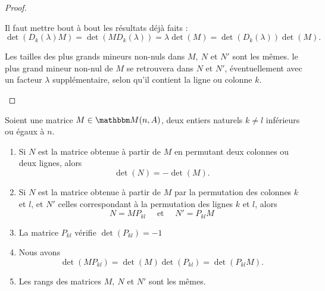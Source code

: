 \begin{proof}
\begin{subproof}
          \item[\ref{ITEMooIFRVooWQYgkK}]
            Il faut mettre bout à bout les résultats déjà faits :
            \begin{equation}
                \det(D_k(\lambda)M)=\det(MD_k(\lambda))=\lambda\det(M)=\det(D_k(\lambda))\det(M).
            \end{equation}
         \item[\ref{ITEMooRangsDilatations}]
            Les tailles des plus grands mineurs non-nuls dans \(M,\ N \) et \( N' \) sont les mêmes. le plus grand mineur non-nul de \( M \) se retrouvera dans \( N \) et \( N' \), éventuellement avec un facteur \( \lambda \) supplémentaire, selon qu'il contient la ligne ou colonne \( k \).
    \end{subproof}
\end{proof}


\begin{proposition}    \label{PROPooFQRDooRPfuxk}
    Soient une matrice \( M\in \eM(n,A)\), deux entiers naturels \( k\neq l\) inférieurs ou égaux à \( n\). 
    \begin{enumerate}
        \item   \label{ITEMooAIHWooHXzeys}
            Si \( N\) est la matrice obtenue à partir de \( M\) en permutant deux colonnes ou deux lignes, alors
            \begin{equation}
                \det(N)=-\det(M).
            \end{equation}
        \item  \label{ITEMooDNHWooOMgmxa}
            Si \( N\) est la matrice obtenue à partir de \( M\) par la permutation des colonnes \( k \) et \( l\), et \( N' \) celles correspondant à la permutation des lignes \( k \) et \( l\), alors
            \begin{equation}
                N=MP_{kl}\quad\text{ et }\quad N'=P_{kl}M
            \end{equation}
        \item \label{ITEMooSHRQooQrqVdO}
            La matrice \( P_{kl}\) vérifie \( \det(P_{kl})=-1\)
        \item       \label{ITEMooQXSEooMWiKbL}
            Nous avons 
            \begin{equation}
                \det(MP_{kl})=\det(M)\det(P_{kl}) = \det(P_{kl}M).
            \end{equation}
        \item     \label{ITEMooRangsPermutations}
            Les rangs des matrices \( M,\ N \) et \( N' \) sont les mêmes.
    \end{enumerate}
\end{proposition}

